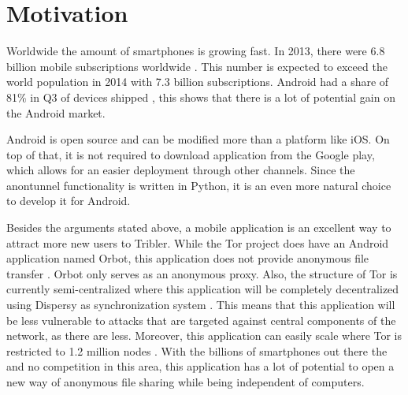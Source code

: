 \section{Motivation}
	\label{scc:motivation}
	Worldwide the amount of smartphones is growing fast. In 2013, there were 6.8 billion mobile subscriptions worldwide \cite{itustatistics}. This number is expected to exceed the world population in 2014 with 7.3 billion subscriptions. Android had a share of 81\% in Q3 of devices shipped \cite{forbesandroidmarket}, this shows that there is a lot of potential gain on the Android market. 
	
	Android is open source and can be modified more than a platform like iOS. On top of that, it is not required to download application from the Google play, which allows for an easier deployment through other channels. Since the anontunnel functionality is written in Python, it is an even more natural choice to develop it for Android.

	Besides the arguments stated above, a mobile application is an excellent way to attract more new users to Tribler. While the Tor project does have an Android application named Orbot, this application does not provide anonymous file transfer \cite{tororbot, googleplayorbot}. Orbot only serves as an anonymous proxy. Also, the structure of Tor is currently semi-centralized \cite{jagerman2014fifteen} where this application will be completely decentralized using Dispersy as synchronization system \cite{zeilemaker2013dispersy}. This means that this application will be less vulnerable to attacks that are targeted against central components of the network, as there are less. Moreover, this application can easily scale where Tor is restricted to 1.2 million nodes \cite{mclachlan2009scalable}. With the billions of smartphones out there the and no competition in this area, this application has a lot of potential to open a new way of anonymous file sharing while being independent of computers.
	

